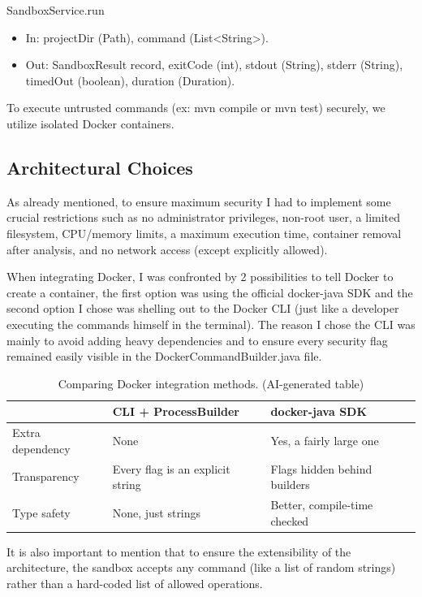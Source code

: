 \documentclass[11pt]{article}
\begin{document}
SandboxService.run

\begin{itemize}
    \item In: projectDir (Path), command (List<String>).
    \item Out: SandboxResult record, exitCode (int), stdout (String), stderr (String), timedOut (boolean), duration (Duration).
\end{itemize}

To execute untrusted commands (ex: mvn compile or mvn test) securely, we utilize isolated Docker containers.

\subsection{Architectural Choices}
As already mentioned, to ensure maximum security I had to implement some crucial restrictions such as no administrator privileges, non-root user, a limited filesystem, CPU/memory limits, a maximum execution time, container removal after analysis, and no network access (except explicitly allowed).

    When integrating Docker, I was confronted by 2 possibilities to tell Docker to create a container, the first option was using the official docker-java SDK and the second option I chose was shelling out to the Docker CLI (just like a developer executing the commands himself in the terminal). The reason I chose the CLI was mainly to avoid adding heavy dependencies and to ensure every security flag remained easily visible in the DockerCommandBuilder.java file.

\begin{table}[h]
\centering
\small
\begin{tabular}{@{}p{4.2cm}p{4.8cm}p{4.8cm}@{}}
\toprule
 & \textbf{CLI + ProcessBuilder} & \textbf{docker-java SDK} \\
\midrule
Extra dependency & None & Yes, a fairly large one \\
Transparency & Every flag is an explicit string & Flags hidden behind builders \\
Type safety & None, just strings & Better, compile-time checked \\
\bottomrule
\end{tabular}
\caption{Comparing Docker integration methods. (AI-generated table)}
\label{tab:docker-choice}
\end{table}

It is also important to mention that to ensure the extensibility of the architecture, the sandbox accepts any command (like a list of random strings) rather than a hard-coded list of allowed operations.
\end{document}
